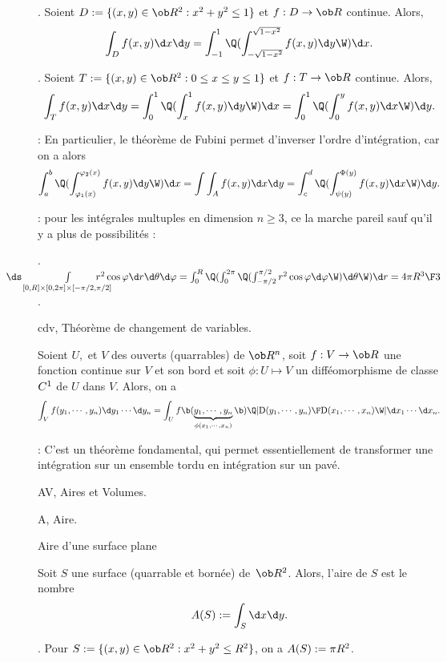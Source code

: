 \Exemple.  Soient $D:=\{(x,y)\in\ob R^2:x^2+y^2\le 1\}$ et $f:D\to\ob R$ continue. 
Alors, $$
\int_Df(x,y)\d x\d y=\int_{-1}^1\Q(\int_{-\sqrt{1-x^2}}^{\sqrt{1-x^2}}f(x,y)\d y\W)\d x.
$$ 
\medskip

\Exemple.  Soient $T:=\{(x,y)\in\ob R^2:0\le x\le y\le 1\}$ et $f:T\to\ob R$ continue. Alors, 
$$
\int_Tf(x,y)\d x\d y=\int_0^1\Q(\int_x^1f(x,y)\d y\W)\d x=\int_0^1\Q(\int_0^yf(x,y)\d x\W)\d y.
$$ 
\bigskip


 : En particulier, le th\'eor\`eme de Fubini permet d'inverser l'ordre d'int\'egration, car on a alors 
$$
\int_a^b\Q(\int_{\varphi_1(x)}^{\varphi_2(x)}f(x,y)\d y\W)\d x=\int\int_Af(x,y)\d x\d y=\int_c^d\Q(\int_{\psi(y)}^{\Phi(y)}f(x,y)\d x\W)\d y.
$$


 : pour les int\'egrales multuples en dimension $n\ge3$, ce la marche pareil sauf qu'il y a plus de possibilit\'es : 
\bigskip

\Exemple.  $\!\!\!\!\!\!\!\!\!\!\!\!\!\!\!\!\!\!\!\ds\int\limits_{[0,R]\times[0,2\pi]\times[-\pi/2,\pi/2]}\!\!\!\!\!\!\!\!\!\!\!r^2\cos\varphi\d r\d\theta\d\varphi=
\int_0^R\Q(\int_0^{2\pi}\Q(\int_{-\pi/2}^{\pi/2}r^2\cos\varphi\d\varphi\W)\d\theta\W)\d r={4\pi R^3\F3}$. 
\bigskip


\Subsection cdv, Th\'eor\`eme de changement de variables. 

\Theoreme [Title=Th\'eor\`eme de changement de variable] 
Soient $U,$ et $V$ des ouverts (quarrables) de $\ob R^n$, soit 
$f:V\to\ob R$ une fonction continue sur $V$ et son bord 
et soit $\phi:U\mapsto V$ un diff\'eomorphisme de classe $\sc C^1$ de $U$ dans $V$. 
Alors, on a 
$$
\int_Vf(y_1,\cdots,y_n)\d y_1\cdots\d y_n
=\int_Uf\b(\underbrace{y_1,\cdots,y_n}_{\phi(x_1,\cdots,x_n)}\b)
\Q|{\mbox{D}(y_1,\cdots,y_n)\F\mbox{D}(x_1,\cdots,x_n)}\W|\d x_1\cdots\d x_n. 
$$

\Remarque : C'est un th\'eor\`eme fondamental, qui permet essentiellement de transformer 
une int\'egration sur un ensemble tordu en int\'egration sur un pav\'e. 
\bigskip

\Section AV, Aires et Volumes.

\Subsection A, Aire. 

\Concept Aire d'une surface plane 

\Definition [] Soit $S$ une surface (quarrable et born\'ee) de~$\ob R^2$. 
Alors, l'aire de $S$ est le nombre 
$$
\sc A(S):=\int_S\d x\d y. 
$$

\Exemple.  Pour $S:=\{(x,y)\in\ob R^2:x^2+y^2\le R^2\}$, on a $\sc A(S):=\pi R^2$. 
\bigskip 

